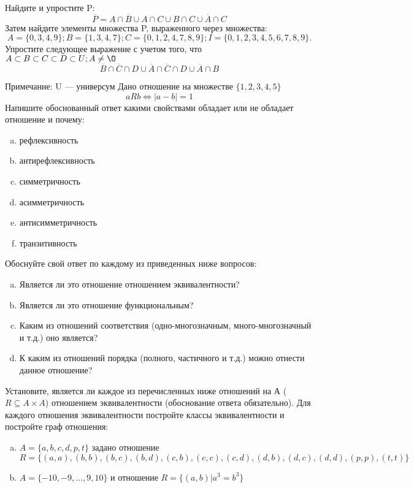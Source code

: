 \documentclass[10pt]{exam}
\begin{document}
\begin{questions}
\question
Найдите и упростите P:
\begin{equation*}
\overline{P} = A \cap \overline{B} \cup A \cap C \cup B \cap C \cup \overline{A} \cap C
\end{equation*}
Затем найдите элементы множества P, выраженного через множества:
\begin{equation*}
A = \{0, 3, 4, 9\}; 
B = \{1, 3, 4, 7\};
C = \{0, 1, 2, 4, 7, 8, 9\};
I = \{0, 1, 2, 3, 4, 5, 6, 7, 8, 9\}.
\end{equation*}\question
Упростите следующее выражение с учетом того, что $A\subset B \subset C \subset D \subset U; A \neq \O$
\begin{equation*}
\overline{B} \cap \overline{C} \cap D \cup \overline{A} \cap \overline{C} \cap D \cup \overline{A} \cap B
\end{equation*}

Примечание: U — универсум\question
Дано отношение на множестве $\{1, 2, 3, 4, 5\}$ 
\begin{equation*}
aRb \iff |a-b| = 1
\end{equation*}
Напишите обоснованный ответ какими свойствами обладает или не обладает отношение и почему:   
\begin{enumerate} [a)]\setcounter{enumi}{0}
\item рефлексивность
\item антирефлексивность
\item симметричность
\item асимметричность
\item антисимметричность
\item транзитивность
\end{enumerate}

Обоснуйте свой ответ по каждому из приведенных ниже вопросов:
\begin{enumerate} [a)]\setcounter{enumi}{0}
    \item Является ли это отношение отношением эквивалентности?
    \item Является ли это отношение функциональным?
    \item Каким из отношений соответствия (одно-многозначным, много-многозначный и т.д.) оно является?
    \item К каким из отношений порядка (полного, частичного и т.д.) можно отнести данное отношение?
\end{enumerate}

\question
Установите, является ли каждое из перечисленных ниже отношений на А ($R \subseteq A \times A$) отношением эквивалентности (обоснование ответа обязательно). Для каждого отношения эквивалентности постройте классы 
эквивалентности и постройте граф отношения:
\begin{enumerate} [a)]\setcounter{enumi}{0}
\item $A = \{a, b, c, d, p, t\}$ задано отношение $R = \{(a, a), (b, b), (b, c), (b, d), (c, b), (c, c), (c, d), (d, b), (d, c), (d, d), (p,p), (t,t)\}$
\item $A = \{-10, -9, … , 9, 10\}$ и отношение $R = \{(a,b)|a^{3} = b^{3}\}$


\end{enumerate}
\end{questions}
\end{document}
